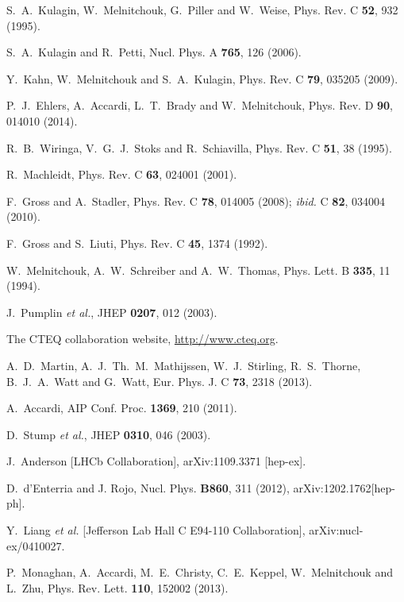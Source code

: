 \documentclass[aps,prd,amsmath,preprint]{revtex4}
\begin{document}
\begin{thebibliography}{99}
S.~A.~Kulagin, W.~Melnitchouk, G.~Piller and W.~Weise,
Phys. Rev. C {\bf 52}, 932 (1995).

S.~A.~Kulagin and R.~Petti,
Nucl. Phys. A {\bf 765}, 126 (2006).

Y.~Kahn, W.~Melnitchouk and S.~A.~Kulagin,
Phys. Rev. C {\bf 79}, 035205 (2009).

P.~J.~Ehlers, A.~Accardi, L.~T.~Brady and W.~Melnitchouk,
Phys. Rev. D {\bf 90}, 014010 (2014).

R.~B.~Wiringa, V.~G.~J.~Stoks and R.~Schiavilla,
Phys. Rev. C {\bf 51}, 38 (1995).

R.~Machleidt,
Phys. Rev. C {\bf 63}, 024001 (2001).

F.~Gross and A.~Stadler,
Phys. Rev. C {\bf 78}, 014005 (2008);
{\it ibid.} C {\bf 82}, 034004 (2010).

F.~Gross and S.~Liuti,
Phys. Rev. C {\bf 45}, 1374 (1992).

W.~Melnitchouk, A.~W.~Schreiber and A.~W.~Thomas,
Phys. Lett. B {\bf 335}, 11 (1994).

J.~Pumplin {\it et al.},
JHEP {\bf 0207}, 012 (2003).
 

The CTEQ collaboration website,
\url{http://www.cteq.org}.

A.~D.~Martin, A.~J.~Th.~M.~Mathijssen, W.~J.~Stirling, R.~S.~Thorne, 
B.~J.~A.~Watt and G.~Watt,
Eur. Phys. J. C {\bf 73}, 2318 (2013).

A.~Accardi,
AIP Conf. Proc. {\bf 1369}, 210 (2011).

D.~Stump {\it et al.},
JHEP {\bf 0310}, 046 (2003).

J.~Anderson [LHCb Collaboration],
arXiv:1109.3371 [hep-ex].

D.~d'Enterria and J. Rojo, Nucl. Phys. {\bf B860}, 311 (2012), 
arXiv:1202.1762[hep-ph].

Y.~Liang {\it et al.} [Jefferson Lab Hall C E94-110 Collaboration],
arXiv:nucl-ex/0410027.

P.~Monaghan, A.~Accardi, M.~E.~Christy, C.~E.~Keppel, W.~Melnitchouk
and L.~Zhu,
Phys. Rev. Lett. {\bf 110}, 152002 (2013).


\end{thebibliography}
\end{document}

